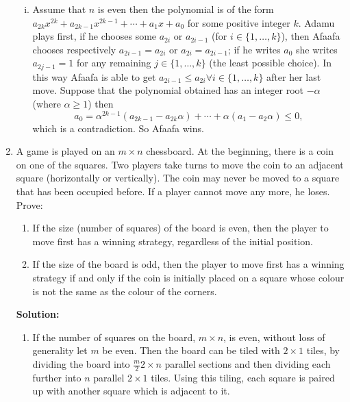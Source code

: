 \documentclass{article}
\newcommand{\solution}[1]{%
\ifsolutions%
    \textbf{Solution: } #1
\fi
}
\begin{document}
\begin{enumerate}
{\begin{enumerate}[i)]
\item Assume that $n$ is even then the polynomial is of the form $a_{2k} x^{2k} + a_{2k - 1} x^{2k - 1} + \cdots + a_1 x + a_0$ for some positive integer $k$. Adamu plays first, if he chooses some $a_{2i}$ or $a_{2i - 1}$ (for $i \in \{ 1, \dots, k \}$), then Afaafa chooses respectively $a_{2i - 1} = a_{2i}$ or $a_{2i} = a_{2i - 1}$; if he writes $a_0$ she writes $a_{2j - 1} = 1$ for any remaining $j \in \{ 1, \dots, k \}$ (the least possible choice). In this way Afaafa is able to get $a_{2i - 1} \leq a_{2i} \forall i \in \{ 1, \dots, k \}$ after her last move. Suppose that the polynomial obtained has an integer root $-\alpha$ (where $\alpha \geq 1$) then
\[
    a_0 = \alpha^{2k - 1} ( a_{2k - 1} - a_{2k} \alpha ) + \cdots + \alpha (a_1 - a_2 \alpha) \leq 0,
\]
which is a contradiction. So Afaafa wins.

\end{enumerate}
}

\item A game is played on an $m \times n$ chessboard. At the beginning, there is a coin on one of the squares. Two players take turns to move the coin to an adjacent square (horizontally or vertically). The coin may never be moved to a square that has been occupied before. If a player cannot move any more, he loses. Prove:
\begin{enumerate}[1.]

\item If the size (number of squares) of the board is even, then the player to move first has a winning strategy, regardless of the initial position.

\item If the size of the board is odd, then the player to move first has a winning strategy if and only if the coin is initially placed on a square whose colour is not the same as the colour of the corners.

\end{enumerate}

\solution{%
\begin{enumerate}[1.]

\item If the number of squares on the board, $m \times n$, is even, without loss of generality let $m$ be even. Then the board can be tiled with $2 \times 1$ tiles, by dividing the board into $\frac{m}{2} 2 \times n$ parallel sections and then dividing each further into $n$ parallel $2 \times 1$ tiles. Using this tiling, each square is paired up with another square which is adjacent to it.


\end{enumerate}}
\end{enumerate}
\end{document}
